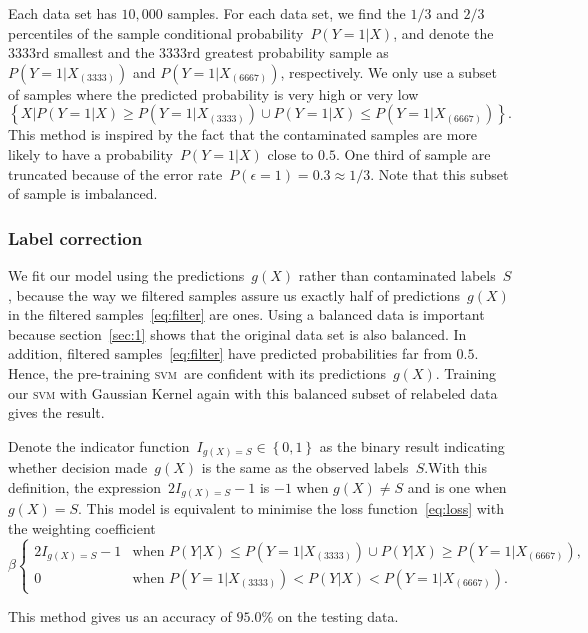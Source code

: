 \documentclass[12pt]{article} %
\newcommand{\svm}{\textsc{svm}}
\begin{document}
Each data set has $10,000$ samples.
For each data set, we find the $1/3$ and $2/3$ percentiles of the sample conditional probability~$P(Y=1|X)$, and denote the $3333$rd smallest and the $3333$rd greatest probability sample as $P(Y=1|X_{(3333)})$ and $P(Y=1|X_{(6667)})$, respectively.
We only use a subset of samples where the predicted probability is very high or very low
\begin{equation}\label{eq:filter}
\left\{X|P(Y=1|X)\geq P(Y=1|X_{(3333)}) \cup P(Y=1|X)\leq P(Y=1|X_{(6667)}) \right\}.
\end{equation}
This method is inspired by the fact that the contaminated samples are more likely to have a probability~$P(Y=1|X)$ close to $0.5$. One third of sample are truncated because of the error rate~$P(\epsilon=1)=0.3\approx 1/3$. Note that this subset of sample is imbalanced.

\subsubsection{Label correction}
We fit our model using the predictions~$g(X)$ rather than contaminated labels~$S$, because the way we filtered samples  assure us exactly half of predictions~$g(X)$ in the filtered samples~\eqref{eq:filter}  are ones.
Using a balanced data is important because section~\ref{sec:1} shows that the original data set is also balanced. In addition, filtered samples~\eqref{eq:filter} have  predicted probabilities far from $0.5$. Hence, the pre-training \svm\ are confident with its predictions~$g(X)$.
Training our \textsc{svm} with Gaussian Kernel again with this balanced subset of relabeled data gives the result.

Denote the indicator function~$I_{g(X)=S} \in \left\{0,1\right\}$ as the binary result indicating whether decision made~$g(X)$ is the same as the observed labels~$S$.With this definition, the expression~$2I_{g(X)=S}-1$ is $-1$ when $g(X)\neq S$ and is one when $g(X)=S$.  This model is equivalent to minimise the loss function~\eqref{eq:loss} with the weighting coefficient
\begin{equation*}
\beta\begin{cases}
2I_{g(X)=S}-1 & \text{when }P({Y}|X)\leq P(Y=1|X_{(3333)}) \cup P({Y}|X)\geq P(Y=1|X_{(6667)}),\\
0 & \text{when }P(Y=1|X_{(3333)})<P({Y}|X)<P(Y=1|X_{(6667)}).
\end{cases}
\end{equation*}


This method gives us an accuracy of $95.0\%$ on the testing data.
\end{document}
